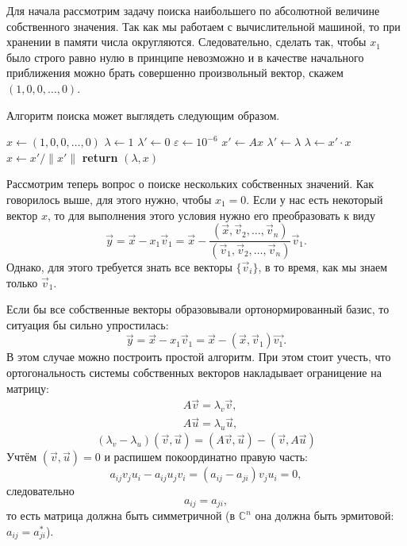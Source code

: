 \documentclass[a4paper,12pt]{article}
\begin{document}
	Для начала рассмотрим задачу поиска наибольшего по абсолютной величине собственного значения. Так как мы работаем с вычислительной машиной, то при хранении в памяти числа округляются. Следовательно, сделать так, чтобы \( x_1 \) было строго равно нулю в принципе невозможно и в качестве начального приближения можно брать совершенно произвольный вектор, скажем \( (1, 0, 0, \ldots, 0) \).

	Алгоритм поиска может выглядеть следующим образом.
	\begin{algorithm}[h]
	  \begin{algorithmic}
	    \State $x \gets (1, 0, 0, \ldots, 0)$ 
	    \State $ \lambda \gets 1 $ 
	    \State $ \lambda' \gets 0 $ 
	    \State $ \varepsilon \gets 10^{-6} $ 
	      \State $x' \gets Ax$
	      \State $\lambda' \gets \lambda$
	      \State $\lambda  \gets x' \cdot x $
	      \State $x \gets x' / \| x' \|  $ 
	    \EndWhile
	    \State \textbf{return} $(\lambda, x)$
	    \EndFunction
	  \end{algorithmic}
	\end{algorithm}

	Рассмотрим теперь вопрос о поиске нескольких собственных значений. Как говорилось выше, для этого нужно, чтобы \( x_1 = 0 \). Если у нас есть некоторый вектор \(x\), то для выполнения этого условия нужно его преобразовать к виду
	\[
		\vec{y} = \vec{x} - x_1\vec{v}_1 = \vec{x} - 
		\frac{(\vec{x}, \vec{v}_2,\ldots,\vec{v}_n)}{(\vec{v}_1,\vec{v}_2,\ldots,\vec{v}_n)}\vec{v}_1.
	\]
	Однако, для этого требуется знать все векторы \( \{ \vec{v}_i \} \), в то время, как мы знаем только \( \vec{v}_1 \).

	Если бы все собственные векторы образовывали ортонормированный базис, то ситуация бы сильно упростилась:
	\[
		\vec{y} = \vec{x} - x_1\vec{v}_1 = \vec{x} - (\vec{x}, \vec{v}_1)\vec{v_1}.
	\]
	В этом случае можно построить простой алгоритм. При этом стоит учесть, что ортогональность системы собственных векторов накладывает ограницение на матрицу:
	\begin{align*}
		& A\vec{v} = \lambda_v\vec{v},\\
		& A\vec{u} = \lambda_u\vec{u},
	\end{align*}
	\[
		(\lambda_v - \lambda_u)(\vec{v}, \vec{u}) = (A\vec{v}, \vec{u}) - (\vec{v}, A\vec{u})
	\]
	Учтём \((\vec{v}, \vec{u}) = 0 \) и распишем покоординатно правую часть:
	\[
		a_{ij} v_j u_i - a_{ij} u_j v_i = (a_{ij} - a_{ji}) v_j u_i = 0,
	\]
	следовательно
	\[
		a_{ij} = a_{ji},
	\]
	то есть матрица должна быть симметричной (в \( \mathbb{C}^n \) она должна быть эрмитовой: \( a_{ij} = a_{ji}^* \)).
\end{document}
